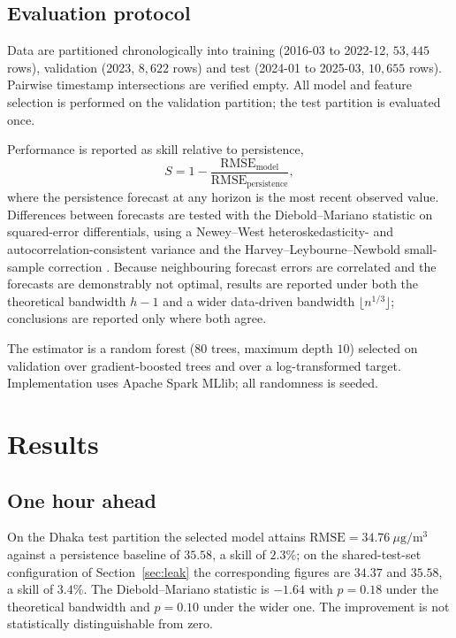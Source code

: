 \documentclass[conference,a4paper]{IEEEtran}
\begin{document}
\subsection{Evaluation protocol}
Data are partitioned chronologically into training (2016-03 to 2022-12,
$53{,}445$ rows), validation (2023, $8{,}622$ rows) and test (2024-01 to 2025-03,
$10{,}655$ rows). Pairwise timestamp intersections are verified empty. All model
and feature selection is performed on the validation partition; the test
partition is evaluated once.

Performance is reported as skill relative to persistence,
\begin{equation}
S = 1 - \frac{\mathrm{RMSE}_{\text{model}}}{\mathrm{RMSE}_{\text{persistence}}},
\end{equation}
where the persistence forecast at any horizon is the most recent observed value.
Differences between forecasts are tested with the Diebold--Mariano statistic
\cite{dm} on squared-error differentials, using a Newey--West
heteroskedasticity- and autocorrelation-consistent variance \cite{nw} and the
Harvey--Leybourne--Newbold small-sample correction \cite{hln}. Because
neighbouring forecast errors are correlated and the forecasts are demonstrably
not optimal, results are reported under both the theoretical bandwidth $h-1$ and
a wider data-driven bandwidth $\lfloor n^{1/3}\rfloor$; conclusions are reported
only where both agree.

The estimator is a random forest \cite{breiman} ($80$ trees, maximum depth $10$)
selected on validation over gradient-boosted trees and over a log-transformed
target. Implementation uses Apache Spark MLlib; all randomness is seeded.

\section{Results}

\subsection{One hour ahead}
On the Dhaka test partition the selected model attains
$\mathrm{RMSE} = 34.76~\mu\mathrm{g/m^3}$ against a persistence baseline of
$35.58$, a skill of $2.3\%$; on the shared-test-set configuration of
Section~\ref{sec:leak} the corresponding figures are $34.37$ and $35.58$, a skill
of $3.4\%$. The Diebold--Mariano statistic is $-1.64$ with $p=0.18$ under the
theoretical bandwidth and $p=0.10$ under the wider one. The improvement is not
statistically distinguishable from zero.
\end{document}
